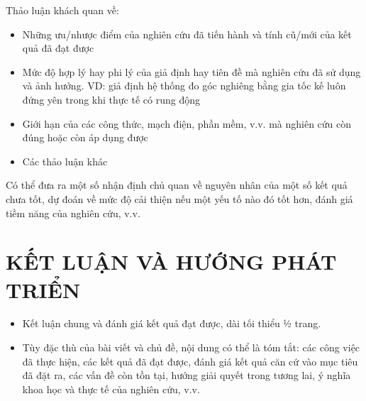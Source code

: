 \documentclass[12pt,a4paper]{report}
\begin{document}
Thảo luận khách quan về:
\begin{itemize}
    \item Những ưu/nhược điểm của nghiên cứu đã tiến hành và tính cũ/mới của kết quả đã đạt được
    \item Mức độ hợp lý hay phi lý của giả định hay tiên đề mà nghiên cứu đã sử dụng và ảnh hưởng. VD: giả định hệ thống đo góc nghiêng bằng gia tốc kế luôn đứng yên trong khi thực tế có rung động
    \item Giới hạn của các công thức, mạch điện, phần mềm, v.v. mà nghiên cứu còn đúng hoặc còn áp dụng được
    \item Các thảo luận khác
\end{itemize}

Có thể đưa ra một số nhận định chủ quan về nguyên nhân của một số kết quả chưa tốt, dự đoán về mức độ cải thiện nếu một yếu tố nào đó tốt hơn, đánh giá tiềm năng của nghiên cứu, v.v.

\chapter{KẾT LUẬN VÀ HƯỚNG PHÁT TRIỂN}
\begin{itemize}
    \item Kết luận chung và đánh giá kết quả đạt được, dài tối thiểu ½ trang.
    \item Tùy đặc thù của bài viết và chủ đề, nội dung có thể là tóm tắt: các công việc đã thực hiện, các kết quả đã đạt được, đánh giá kết quả căn cứ vào mục tiêu đã đặt ra, các vấn đề còn tồn tại, hướng giải quyết trong tương lai, ý nghĩa khoa học và thực tế của nghiên cứu, v.v.
\end{itemize}
\end{document}

